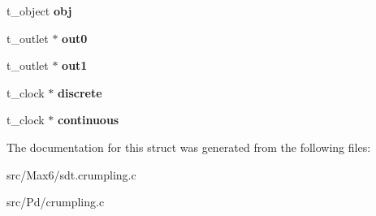 \begin{DoxyCompactItemize}
\item 
\hypertarget{struct__crumpling_a21775ab6bc98b0961a6e9fd9d832e65b}{}t\+\_\+object {\bfseries obj}\label{struct__crumpling_a21775ab6bc98b0961a6e9fd9d832e65b}

\item 
\hypertarget{struct__crumpling_a6af9a9095f07d4ff9044afa8f70690da}{}t\+\_\+outlet $\ast$ {\bfseries out0}\label{struct__crumpling_a6af9a9095f07d4ff9044afa8f70690da}

\item 
\hypertarget{struct__crumpling_a0911a1b2754eb05fc43835c9f25e805c}{}t\+\_\+outlet $\ast$ {\bfseries out1}\label{struct__crumpling_a0911a1b2754eb05fc43835c9f25e805c}

\item 
\hypertarget{struct__crumpling_a28c3986aecbe155e8e1172a3f63cc6a1}{}t\+\_\+clock $\ast$ {\bfseries discrete}\label{struct__crumpling_a28c3986aecbe155e8e1172a3f63cc6a1}

\item 
\hypertarget{struct__crumpling_ae0414439e1d7240f8432f26ee9a7fb9d}{}t\+\_\+clock $\ast$ {\bfseries continuous}\label{struct__crumpling_ae0414439e1d7240f8432f26ee9a7fb9d}

\end{DoxyCompactItemize}


The documentation for this struct was generated from the following files\+:\begin{DoxyCompactItemize}
\item 
src/\+Max6/sdt.\+crumpling.\+c\item 
src/\+Pd/crumpling.\+c\end{DoxyCompactItemize}
